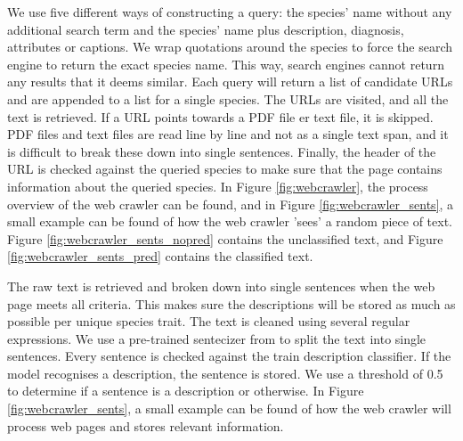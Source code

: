 \documentclass[a4paper, 12pt, oneside]{book} %
\begin{document}
We use five different ways of constructing a query: the species' name without any additional search term and the species' name plus description, diagnosis, attributes or captions.
We wrap quotations around the species to force the search engine to return the exact species name.
This way, search engines cannot return any results that it deems similar.
Each query will return a list of candidate URLs and are appended to a list for a single species.
The URLs are visited, and all the text is retrieved.
If a URL points towards a PDF file er text file, it is skipped.
PDF files and text files are read line by line and not as a single text span, and it is difficult to break these down into single sentences. 
Finally, the header of the URL is checked against the queried species to make sure that the page contains information about the queried species.
In Figure \ref{fig:webcrawler}, the process overview of the web crawler can be found, and in Figure \ref{fig:webcrawler_sents}, a small example can be found of how the web crawler 'sees' a random piece of text.
Figure \ref{fig:webcrawler_sents_nopred} contains the unclassified text, and Figure \ref{fig:webcrawler_sents_pred} contains the classified text.

The raw text is retrieved and broken down into single sentences when the web page meets all criteria. 
This makes sure the descriptions will be stored as much as possible per unique species trait.
The text is cleaned using several regular expressions. %
We use a pre-trained sentecizer from \textcite{wolf_huggingfaces_2020} to split the text into single sentences.
Every sentence is checked against the train description classifier.
If the model recognises a description, the sentence is stored. 
We use a threshold of 0.5 to determine if a sentence is a description or otherwise.
In Figure \ref{fig:webcrawler_sents}, a small example can be found of how the web crawler will process web pages and stores relevant information. 
\end{document}
